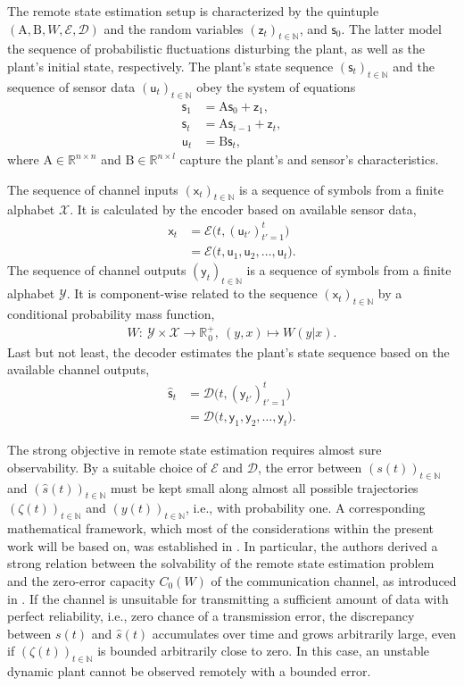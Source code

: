 \documentclass[conference]{IEEEtran}
\newcommand{\rx}{\mathsf{x}}
\newcommand{\ry}{\mathsf{y}}
\newcommand{\rs}{\mathsf{s}}
\newcommand{\rz}{\mathsf{z}}
\newcommand{\ru}{\mathsf{u}}
\def\E{{\mathcal E}}
\def\D{{\mathcal D}}
\def\X{{\mathcal X}}
\def\Y{{\mathcal Y}}
\def\NN{{\mathbb N}}
\def\RR{{\mathbb R}}
\def\mA{\bm{\mathrm{A}}}
\def\mB{\bm{\mathrm{B}}}
\begin{document}
	The remote state estimation setup is characterized by the quintuple \((\mA,\mB,W,\E,\D)\) and the random variables \((\rz_t)_{t\in\NN}\), and \(\rs_{0}\). 
	The latter model the sequence of probabilistic fluctuations disturbing the plant, as well as the plant's initial state, respectively. The plant's state sequence \((\rs_t)_{t\in\NN}\) 
	and the sequence of sensor data \((\ru_t)_{t\in\NN}\) obey the system of equations
	\begin{align*}	\rs_1    &= \mA \rs_0 + \rz_1, \\ 
					\rs_t    &= \mA \rs_{t-1} + \rz_t,\\ 
					\ru_t    &= \mB \rs_t,
	\end{align*}
	where \(\mA\in\RR^{n\times n}\) and \(\mB\in\RR^{n\times l}\) capture the plant's and sensor's characteristics. 

	The sequence of channel inputs \((\rx_t)_{t\in\NN}\) is a sequence
	of symbols from a finite alphabet \(\X\). It is calculated by the encoder based on available sensor data,
	\begin{align*}	\rx_t   &= \E \big(t, (\ru_{t'})_{t'=1}^{t}\big) \\
							&= \E\big(t, \ru_1,\ru_2,\ldots,\ru_t\big).
	\end{align*} 
	The sequence of channel outputs \((\ry_t)_{t\in\NN}\) is a sequence
	of symbols from a finite alphabet \(\Y\). It is component-wise related to the sequence \((\rx_t)_{t\in\NN}\) by a conditional probability mass function,
	\begin{align*}	W :~ \Y \times \X \rightarrow \RR_{\hspace{1pt}0}^+,~(y,x) \mapsto W(y|x).
	\end{align*}
	Last but not least, the decoder estimates the plant's state sequence based on the available channel outputs,
	\begin{align*}	\hat{\rs}_t  	&= \D \big(t, (\ry_{t'})_{t'=1}^{t}\big) \\ 
									&= \D\big(t,\ry_1,\ry_2,\ldots,\ry_t\big).
	\end{align*}

	The strong objective in remote state estimation requires almost sure observability. By a suitable choice of \(\E\) and \(\D\), the error between \((s(t))_{t\in\NN}\)
	and \((\hat{s}(t))_{t\in\NN}\) must be kept small along almost all possible trajectories \((\zeta(t))_{t\in\NN}\) and \((y(t))_{t\in\NN}\), i.e., with probability one.
	A corresponding mathematical framework, which most of the considerations within the present work will be based on, was established in \cite{MS07}.
	In particular, the authors derived a strong relation between the solvability of the remote state estimation problem and the zero-error capacity \(C_0(W)\) of the 
	communication channel, as introduced in \cite{Sh56}. If the channel is unsuitable for transmitting a sufficient amount of data with perfect reliability, i.e., zero 
	chance of a transmission error, the discrepancy between \(s(t)\) and \(\hat{s}(t)\) accumulates over time and grows arbitrarily large, even if \((\zeta(t))_{t\in\NN}\) 
	is bounded arbitrarily close to zero. In this case, an unstable dynamic plant cannot be observed remotely with a bounded error. 
\end{document}
